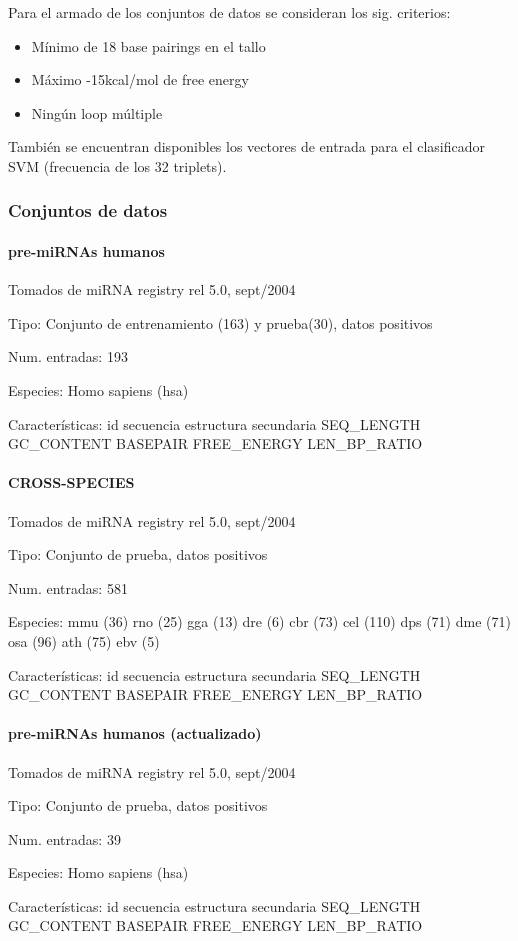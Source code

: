 \documentclass[12pt,bibliography=openstyle,DIV=12,parskip=half-]{scrartcl}
\begin{document}
Para el armado de los conjuntos de datos se consideran los sig. criterios:
\begin{itemize}
\item Mínimo de 18 base pairings en el tallo
\item Máximo -15kcal/mol de free energy
\item Ningún loop múltiple
\end{itemize}

También se encuentran disponibles los vectores de entrada para el
clasificador SVM (frecuencia de los 32 triplets).
%
\subsubsection{Conjuntos de datos}
\paragraph{pre-miRNAs humanos}
Tomados de miRNA registry rel 5.0, sept/2004
\begin{description*}
\item[Tipo:] Conjunto de entrenamiento (163) y prueba(30), datos positivos
\item[Num. entradas:] 193
\item[Especies:] Homo sapiens (hsa)
\item[Características:]
id \quad
secuencia \quad
estructura secundaria \quad
SEQ\_LENGTH \quad
GC\_CONTENT \quad
BASEPAIR \quad
FREE\_ENERGY \quad
LEN\_BP\_RATIO
\end{description*}
\paragraph{CROSS-SPECIES}
Tomados de miRNA registry rel 5.0, sept/2004
\begin{description*}
\item[Tipo:] Conjunto de prueba, datos positivos
\item[Num. entradas:] 581
\item[Especies:]
\quad mmu (36)
\quad rno (25)
\quad gga (13)
\quad dre (6)
\quad cbr (73)
\quad cel (110)
\quad dps (71)
\quad dme (71)
\quad osa (96)
\quad ath (75)
\quad ebv (5)
\item[Características:]
id \quad
secuencia \quad
estructura secundaria \quad
SEQ\_LENGTH \quad
GC\_CONTENT \quad
BASEPAIR \quad
FREE\_ENERGY \quad
LEN\_BP\_RATIO
\end{description*}
\paragraph{pre-miRNAs humanos (actualizado)}
Tomados de miRNA registry rel 5.0, sept/2004
\begin{description*}
\item[Tipo:] Conjunto de prueba, datos positivos
\item[Num. entradas:] 39
\item[Especies:]  Homo sapiens (hsa)
\item[Características:]id \quad
secuencia \quad
estructura secundaria \quad
SEQ\_LENGTH \quad
GC\_CONTENT \quad
BASEPAIR \quad
FREE\_ENERGY \quad
LEN\_BP\_RATIO
\end{description*}
\end{document}
